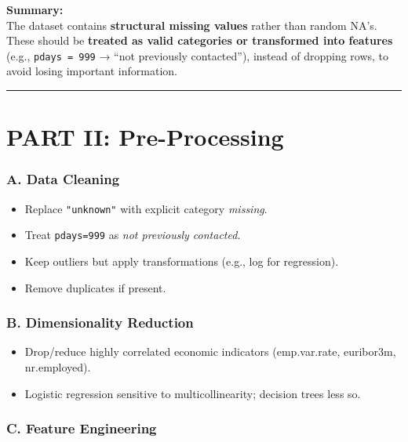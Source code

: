 \documentclass[
]{article}
\providecommand{\tightlist}{%
  \setlength{\itemsep}{0pt}\setlength{\parskip}{0pt}}
\begin{document}
\textbf{Summary:}\\
The dataset contains \textbf{structural missing values} rather than
random NA's. These should be \textbf{treated as valid categories or
transformed into features} (e.g., \texttt{pdays\ =\ 999} → ``not
previously contacted''), instead of dropping rows, to avoid losing
important information.

\begin{center}\rule{0.5\linewidth}{0.5pt}\end{center}

\section{PART II: Pre-Processing}\label{part-ii-pre-processing}

\subsubsection{A. Data Cleaning}\label{a.-data-cleaning}

\begin{itemize}
\tightlist
\item
  Replace \texttt{"unknown"} with explicit category \emph{missing}.\\
\item
  Treat \texttt{pdays=999} as \emph{not previously contacted}.\\
\item
  Keep outliers but apply transformations (e.g., log for regression).\\
\item
  Remove duplicates if present.
\end{itemize}

\subsubsection{B. Dimensionality
Reduction}\label{b.-dimensionality-reduction}

\begin{itemize}
\tightlist
\item
  Drop/reduce highly correlated economic indicators (emp.var.rate,
  euribor3m, nr.employed).\\
\item
  Logistic regression sensitive to multicollinearity; decision trees
  less so.
\end{itemize}

\subsubsection{C. Feature Engineering}\label{c.-feature-engineering}
\end{document}
